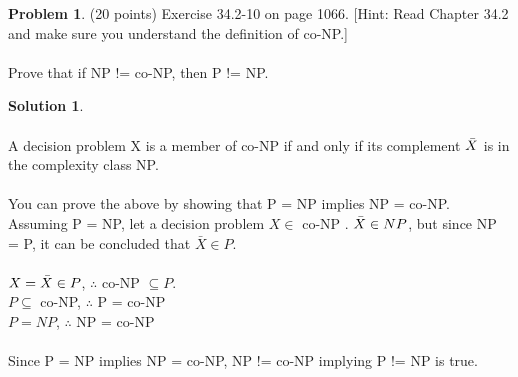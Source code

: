 \documentclass{article}
\theoremstyle{definition}
\newtheorem{problem}{Problem}
\newtheorem*{solution}{Solution}
\begin{document}
\begin{problem} (20 points) %
Exercise 34.2-10 on page 1066. [Hint: Read Chapter 34.2 and make sure you
understand the definition of co-NP.] \\
\\
Prove that if NP != co-NP, then P != NP.

\end{problem}
\begin{solution} \\
\\
A decision problem X is a member of co-NP if and only if its complement $\Bar{X}$ is in the complexity class NP.\\
\\
You can prove the above by showing that P = NP implies NP = co-NP. Assuming P = NP, let a decision problem $X \in $ co-NP . $\Bar{X} \in NP$, but since NP = P, it can be concluded that $\bar{X} \in P$.\\
\\
$X = \Bar{X} \in P$, $\therefore$ co-NP $\subseteq P$. \\
$P \subseteq $ co-NP, $\therefore$ P = co-NP\\
$P = NP$, $\therefore$ NP = co-NP\\
\\
Since P = NP implies NP = co-NP, NP != co-NP implying P != NP is true.\\

\end{solution}

\newpage
\end{document}
